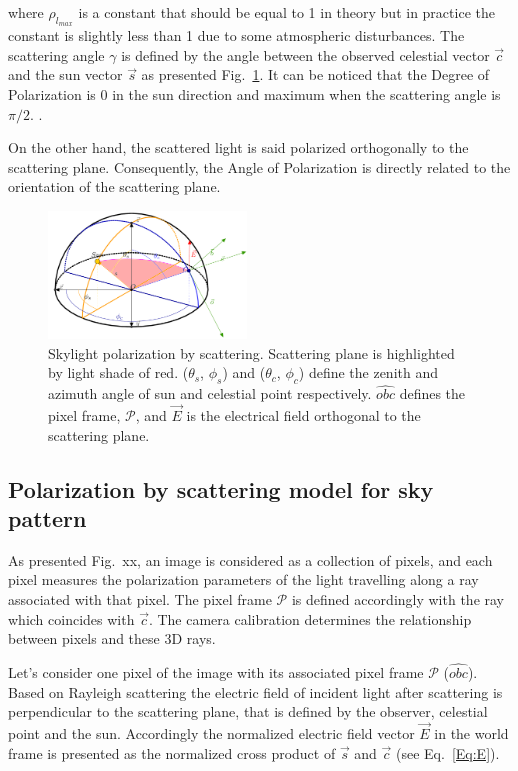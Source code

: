 where $\rho_{l_{max}}$ is a constant that should be equal to 1 in theory but in practice
the constant is slightly less than 1 due to some atmospheric disturbances\cite{pomozi2001clearsky}.
The scattering angle $\gamma$ is defined by the angle between the observed celestial vector $\vec{c}$ and the sun 
vector $\vec{s}$ as presented Fig.~\ref{fig:scattering}. It can be noticed that
the Degree of Polarization is 0 in the sun direction and maximum when the scattering angle is $\pi/2$.
\cite{smith2007polarization, miyazaki09sunlightpolarization}.

On the other hand, the scattered light is said polarized orthogonally to the scattering plane.
Consequently, the Angle of Polarization is directly related to the orientation of the scattering plane.

\begin{figure}
  \centering
  \includegraphics[width=0.47\textwidth]{./content/intro/figures/polasky-iros-small.png}
  \caption{Skylight polarization by scattering. Scattering plane is highlighted
  by light shade of red. ($\theta_s$, $\phi_s$) and ($\theta_c$, $\phi_c$)
  define the zenith and azimuth angle of sun and celestial point
  respectively. $\widehat{obc}$ defines the pixel frame, $\mathcal{P}$, and
  $\vec{E}$ is the electrical field orthogonal to the scattering plane.}
    \label{fig:scattering}
\end{figure}


\subsection{Polarization by scattering model for sky pattern}
\label{subsec:pscattering}
As presented Fig.~xx, an image is considered as a collection of pixels, and each pixel measures the polarization 
parameters of the light travelling along a ray associated with that pixel. The pixel frame $\mathcal{P}$ is defined 
accordingly with the ray which coincides with $\vec{c}$. The camera calibration determines the relationship between 
pixels and these 3D rays.

Let's consider one pixel of the image with its associated pixel frame $\mathcal{P}$ ($\widehat{obc}$).
Based on Rayleigh scattering the electric field of incident light after
scattering is perpendicular to the scattering plane, that is defined by the
observer, celestial point and the sun.  
Accordingly the normalized electric field vector $\vec{E}$ in the world frame
is presented as the normalized cross product of $\vec{s}$ and
$\vec{c}$ (see Eq.~\ref{Eq:E}).

